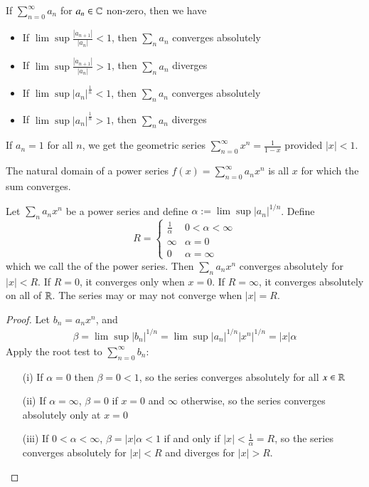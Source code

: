 \begin{thm}
    If $\sum_{n=0}^{\infty}a_n$ for $a_n \in \mathbb C$ non-zero, then we have \begin{itemize}
        \item If $\lim\sup\frac{|a_{n+1}|}{|a_n|} < 1$, then $\sum_na_n$ converges absolutely
        \item If $\lim\sup\frac{|a_{n+1}|}{|a_n|} > 1$, then $\sum_na_n$ diverges
        \item If $\lim\sup|a_n|^{\frac{1}{n}} < 1$, then $\sum_na_n$ converges absolutely
        \item If $\lim\sup|a_n|^{\frac{1}{n}} > 1$, then $\sum_na_n$ diverges
    \end{itemize}
\end{thm}

\begin{eg}
    If $a_n = 1$ for all $n$, we get the geometric series $\sum_{n=0}^{\infty}x^n = \frac{1}{1-x}$ provided $|x| < 1$.
\end{eg}
The natural domain of a power series $f(x) = \sum_{n=0}^{\infty}a_nx^n$ is all $x$ for which the sum converges.

\begin{prop}
    Let $\sum_na_nx^n$ be a power series and define $\alpha:= \lim\sup|a_n|^{1/n}$. Define $$R = \left\{\begin{array}{cc}\frac{1}{\alpha} & 0 < \alpha < \infty \\ \infty & \alpha = 0 \\ 0 & \alpha = \infty \end{array}\right.$$
    which we call the  of the power series. Then $\sum_na_nx^n$ converges absolutely for $|x| < R$. If $R = 0$, it converges only when $x = 0$. If $R = \infty$, it converges absolutely on all of $\mathbb R$. The series may or may not converge when $|x| = R$.
\end{prop}
\begin{proof}
    Let $b_n = a_nx^n$, and \begin{align*}
        \beta = \lim\sup|b_n|^{1/n} = \lim\sup|a_n|^{1/n}|x^n|^{1/n} = |x|\alpha
    \end{align*}
    Apply the root test to $\sum_{n=0}^{\infty}b_n$: \begin{itemize}
        \item[(i)] If $\alpha = 0$ then $\beta = 0 <1$, so the series converges absolutely for all $x \in \mathbb R$
        \item[(ii)] If $\alpha = \infty$, $\beta = 0$ if $x = 0$ and $\infty$ otherwise, so the series converges absolutely only at $x  =0$
        \item[(iii)] If $0 < \alpha < \infty$, $\beta = |x| \alpha < 1$ if and only if $|x| < \frac{1}{\alpha} = R$, so the series converges absolutely for $|x| < R$ and diverges for $|x| > R$.
    \end{itemize}
\end{proof}

